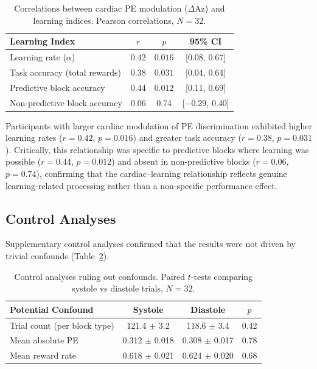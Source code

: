 \documentclass[11pt]{article}
\begin{document}
\begin{table}[H]
\centering
\caption{Correlations between cardiac PE modulation ($\Delta$Az) and learning indices. Pearson correlations, $N = 32$.}
\label{tab:individual}
\begin{tabular}{lccc}
\toprule
Learning Index & $r$ & $p$ & 95\% CI \\
\midrule
Learning rate ($\alpha$) & 0.42 & $\mathbf{0.016}$ & [0.08, 0.67] \\
Task accuracy (total rewards) & 0.38 & $\mathbf{0.031}$ & [0.04, 0.64] \\
Predictive block accuracy & 0.44 & $\mathbf{0.012}$ & [0.11, 0.69] \\
Non-predictive block accuracy & 0.06 & 0.74 & [$-$0.29, 0.40] \\
\bottomrule
\end{tabular}
\end{table}

Participants with larger cardiac modulation of PE discrimination exhibited higher learning rates ($r = 0.42$, $p = 0.016$) and greater task accuracy ($r = 0.38$, $p = 0.031$). Critically, this relationship was specific to predictive blocks where learning was possible ($r = 0.44$, $p = 0.012$) and absent in non-predictive blocks ($r = 0.06$, $p = 0.74$), confirming that the cardiac--learning relationship reflects genuine learning-related processing rather than a non-specific performance effect.

\subsection{Control Analyses}

Supplementary control analyses confirmed that the results were not driven by trivial confounds (Table~\ref{tab:controls}).

\begin{table}[H]
\centering
\caption{Control analyses ruling out confounds. Paired $t$-tests comparing systole vs diastole trials, $N = 32$.}
\label{tab:controls}
\begin{tabular}{lccc}
\toprule
Potential Confound & Systole & Diastole & $p$ \\
\midrule
Trial count (per block type) & 121.4 $\pm$ 3.2 & 118.6 $\pm$ 3.4 & 0.42 \\
Mean absolute PE & 0.312 $\pm$ 0.018 & 0.308 $\pm$ 0.017 & 0.78 \\
Mean reward rate & 0.618 $\pm$ 0.021 & 0.624 $\pm$ 0.020 & 0.68 \\
\bottomrule
\end{tabular}
\end{table}
\end{document}
